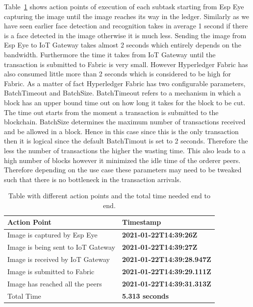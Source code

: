 Table~\ref{actionpoint} shows action points of execution of each subtask starting from Esp Eye capturing the image until the image reaches its way in the ledger. Similarly as we have seen earlier face detection and recognition takes in average 1 second if there is a face detected in the image otherwise it is much less. Sending the image from Esp Eye to IoT Gateway takes almost 2 seconds which entirely depends on the bandwidth. Furthermore the time it takes from IoT Gateway until the transaction is submitted to Fabric is very small. 
However Hyperledger Fabric has also consumed little more than 2 seconds which is considered to be high for Fabric. As a matter of fact Hyperledger Fabric has two configurable parameters, BatchTimeout and BatchSize. BatchTimeout refers to a mechanism in which a block has an upper bound time out on how long it takes for the block to be cut. The time out starts from the moment a transaction is submitted to the blockchain. BatchSize determines the maximum number of transactions received and be allowed in a block. 
Hence in this case since this is the only transaction then it is logical since the default BatchTimout is set to 2 seconds. Therefore the less the number of transactions the higher the wasting time. This also leads to a high number of blocks however it minimized the idle time of the orderer peers. Therefore depending on the use case these parameters may need to be tweaked such that there is no bottleneck in the transaction arrivals.  




\begin{table}[hbt!]

    
    \begin{tabular}{  p{7.4cm}  p{7.4cm}   }
      
\textbf{Action Point}      
& \textbf{Timestamp}   
\\\midrule
Image is captured by Esp Eye & \textbf{2021-01-22T14:39:26Z}         
\\\hline

Image is being sent to IoT Gateway & \textbf{2021-01-22T14:39:27Z}      
 \\\hline
Image is received by IoT Gateway & \textbf{2021-01-22T14:39:28.947Z}   
 \\\hline
Image is submitted to Fabric & \textbf{2021-01-22T14:39:29.111Z}
 \\\hline
Image has reached all the peers  & \textbf{2021-01-22T14:39:31.313Z}
 \\\hline
Total Time & \textbf{5.313 seconds}
 \\
        \bottomrule
    \end{tabular}
    \caption{Table with different action points and the total time needed end to end.}
    \label{actionpoint}
\end{table}


